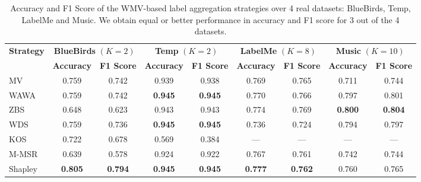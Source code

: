 \documentclass{cap2024}
\begin{document}
\begin{table}[h]
  \centering
  \caption{Accuracy and F1 Score of the WMV-based label aggregation strategies over 4 real datasets: BlueBirds, Temp, LabelMe and Music. We obtain equal or better performance in accuracy and F1 score for 3 out of the 4 datasets.\\ }
  \label{tab:scores}

  \footnotesize{
  \begin{tabular}{l|cc|cc|cc|cc}
  \hline
  \multirow{2}{*}{\textbf{Strategy}} & \multicolumn{2}{c|}{\textbf{BlueBirds} $(K=2)$} & \multicolumn{2}{c|}{\textbf{Temp} $(K=2)$} & \multicolumn{2}{c|}{\textbf{LabelMe} $(K=8)$} & \multicolumn{2}{c}{\textbf{Music} $(K=10)$} \\
  \cline{2-9}
   & \textbf{Accuracy} & \textbf{F1 Score} & \textbf{Accuracy} & \textbf{F1 Score} & \textbf{Accuracy} & \textbf{F1 Score} & \textbf{Accuracy} & \textbf{F1 Score} \\
  \hline
  MV    & 0.759 & 0.742 & 0.939 & 0.938 & 0.769 & 0.765 & 0.711 & 0.744 \\
  WAWA  & 0.759 & 0.742 & \textbf{0.945} & \textbf{0.945} & 0.770 & 0.766 & 0.797 & 0.801 \\
  ZBS   & 0.648 & 0.623 & 0.943 & 0.943 & 0.774 & 0.769 & \textbf{0.800} & \textbf{0.804} \\
  WDS   & 0.759 & 0.736 & \textbf{0.945} & \textbf{0.945} & 0.736 & 0.724 & 0.794 & 0.797 \\
  KOS   & 0.722 & 0.678 & 0.569 & 0.384 & --- & --- & --- & --- \\
  M-MSR & 0.639 & 0.578 & 0.924 & 0.922 & 0.767 & 0.761 & 0.742 & 0.744 \\
  \rowcolor{lightgray} Shapley & \textbf{0.805}& \textbf{0.794}& \textbf{0.945} & \textbf{0.945} & \textbf{0.777} & \textbf{0.762} & 0.760 & 0.765  \\

  \hline
  \end{tabular}
  }
  \end{table}

\end{document}
